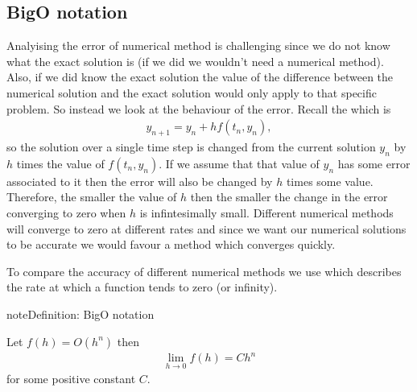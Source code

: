 \documentclass[letterpaper,10pt,english]{jupyterBook}
\begin{document}
\subsection{Big\sphinxhyphen{}O notation}
\label{\detokenize{1_IVPs/1.3_Error_Analysis:big-o-notation}}\label{\detokenize{1_IVPs/1.3_Error_Analysis:big-o-notation-section}}
\sphinxAtStartPar
Analyising the error of numerical method is challenging since we do not know what the exact solution is (if we did we wouldn’t need a numerical method). Also, if we did know the exact solution the value of the difference between the numerical solution and the exact solution would only apply to that specific problem. So instead we look at the behaviour of the error. Recall the {\hyperref[\detokenize{1_IVPs/1.2_Euler_Method:euler-method-section}]{}} which is
\begin{equation*}
\begin{split}y_{n+1} = y_n + h f(t_n, y_n),\end{split}
\end{equation*}
\sphinxAtStartPar
so the solution over a single time step is changed from the current solution \(y_n\) by \(h\) times the value of \(f(t_n, y_n)\). If we assume that that value of \(y_n\) has some error associated to it then the error will also be changed by \(h\) times some value. Therefore, the smaller the value of \(h\) then the smaller the change in the error converging to zero when \(h\) is infintesimally small. Different numerical methods will converge to zero at different rates and since we want our numerical solutions to be accurate we would favour a method which converges quickly.

\sphinxAtStartPar
To compare the accuracy of different numerical methods we use  which describes the rate at which a function tends to zero (or infinity).

\begin{sphinxadmonition}{note}{Definition: Big\sphinxhyphen{}O notation}

\sphinxAtStartPar
Let \(f(h) = O(h^n)\) then
\begin{equation*}
\begin{split}\lim_{h \to 0} f(h) = Ch^n\end{split}
\end{equation*}
\sphinxAtStartPar
for some positive constant \(C\).
\end{sphinxadmonition}
\end{document}

